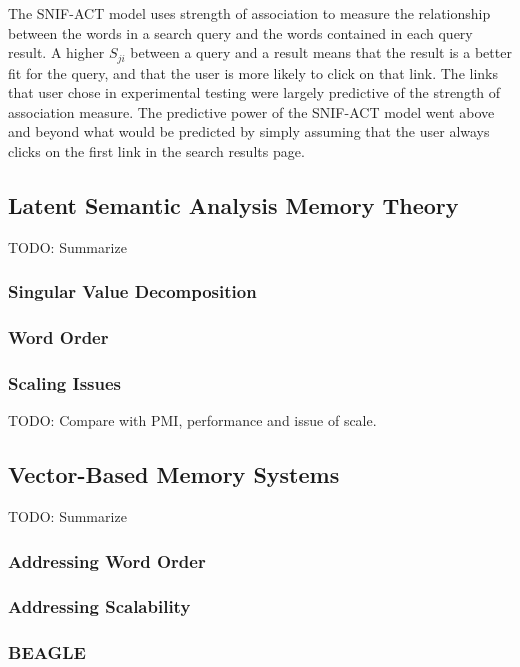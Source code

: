 \documentclass[man]{apa6}
\begin{document}
The SNIF-ACT model uses strength of association to measure the relationship between the words in a search query and the words contained in each query result.
A higher $S_{ji}$ between a query and a result means that the result is a better fit for the query, and that the user is more likely to click on that link.
The links that user chose in experimental testing were largely predictive of the strength of association measure.
The predictive power of the SNIF-ACT model went above and beyond what would be predicted by simply assuming that the user always clicks on the first link in the search results page.

\subsection{Latent Semantic Analysis Memory Theory}

TODO: Summarize \cite{Landauer1997}

\subsubsection{Singular Value Decomposition}

\subsubsection{Word Order}

\subsubsection{Scaling Issues}

TODO: Compare with PMI, performance and issue of scale. \cite{Budiu2007}

\subsection{Vector-Based Memory Systems}

TODO: Summarize \cite{Plate1995}

\subsubsection{Addressing Word Order}

\subsubsection{Addressing Scalability}

\subsubsection{BEAGLE}
\end{document}
